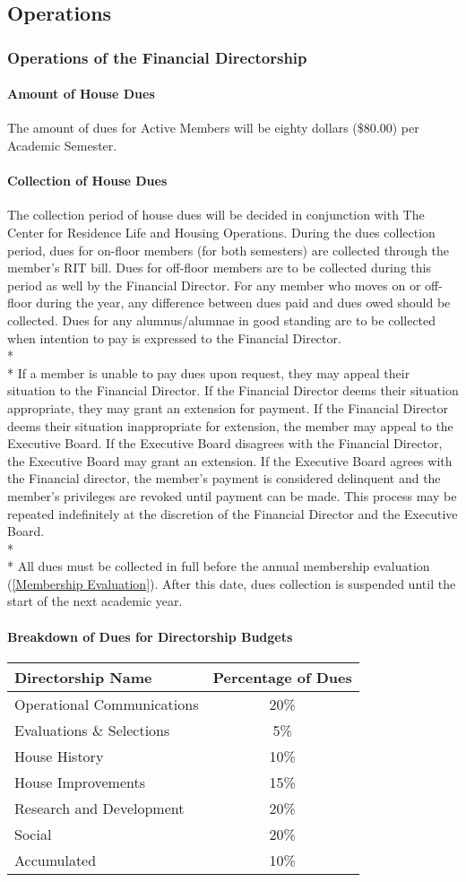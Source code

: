 \documentclass{article}
\newcommand{\asection}[1]{\subsection{#1} \label{#1}}
\newcommand{\asubsection}[1]{\subsubsection{#1} \label{#1}}
\newcommand{\asubsubsection}[1]{\paragraph{#1} \label{#1}}
\begin{document}
\asection{Operations}
\asubsection{Operations of the Financial Directorship}
\asubsubsection{Amount of House Dues}
The amount of dues for Active Members will be eighty dollars (\$80.00) per Academic Semester.
\asubsubsection{Collection of House Dues}
The collection period of house dues will be decided in conjunction with The Center for Residence Life and Housing Operations.
During the dues collection period, dues for on-floor members (for both semesters) are collected through the member’s RIT bill.
Dues for off-floor members are to be collected during this period as well by the Financial Director.
For any member who moves on or off-floor during the year, any difference between dues paid and dues owed should be collected.
Dues for any alumnus/alumnae in good standing are to be collected when intention to pay is expressed to the Financial Director.
\\*\\*
If a member is unable to pay dues upon request, they may appeal their situation to the Financial Director.
If the Financial Director deems their situation appropriate, they may grant an extension for payment.
If the Financial Director deems their situation inappropriate for extension, the member may appeal to the Executive Board.
If the Executive Board disagrees with the Financial Director, the Executive Board may grant an extension.
If the Executive Board agrees with the Financial director, the member’s payment is considered delinquent and the member’s privileges are revoked until payment can be made.
This process may be repeated indefinitely at the discretion of the Financial Director and the Executive Board.
\\*\\*
All dues must be collected in full before the annual membership evaluation (\ref{Membership Evaluation}).
After this date, dues collection is suspended until the start of the next academic year.
\asubsubsection{Breakdown of Dues for Directorship Budgets}
\begin{center}
\begin{tabular}[c]{l c}
Directorship Name & Percentage of Dues \\
\hline
\hline
Operational Communications & 20\% \\
\hline
Evaluations \& Selections & 5\% \\
\hline
House History & 10\% \\
\hline
House Improvements & 15\% \\
\hline
Research and Development & 20\% \\
\hline
Social & 20\% \\
\hline
Accumulated & 10\% \\
\hline
\end{tabular}
\end{center}
\end{document}
